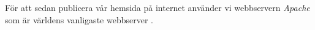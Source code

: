 För att sedan publicera vår hemsida på internet använder vi webbservern \emph{Apache} som är världens vanligaste webbserver \cite{apache}.

%
%
%
